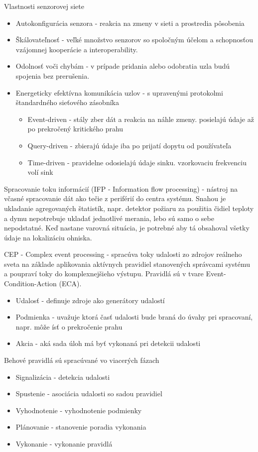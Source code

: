 Vlastnosti senzorovej siete
\begin{itemize}
\itemsep0em
\item Autokonfigurácia senzora - reakcia na zmeny v sieti a prostredia pôsobenia
\item Škálovateľnosť - veľké množstvo senzorov so spoločným účelom a schopnosťou vzájomnej kooperácie a interoperability.
\item Odolnosť voči chybám - v prípade pridania alebo odobratia uzla budú spojenia bez prerušenia.
\item Energeticky efektívna komunikácia uzlov - s upravenými protokolmi štandardného sieťového zásobníka
\begin{itemize}
\itemsep0em
\item Event-driven - stály zber dát a reakcia na náhle zmeny. posielajú údaje až po prekročený kritického prahu
\item Query-driven - zbierajú údaje iba po prijatí dopytu od používateľa
\item Time-driven - pravidelne odosielajú údaje sinku. vzorkovaciu frekvenciu volí sink
\end{itemize}
\end{itemize}
\cite{wsn-overview}

Spracovanie toku informácií (IFP - Information flow processing) - nástroj na včasné spracovanie dát ako tečie z periférií do centra systému. Snahou je ukladanie agregovaných štatistík, napr. detektor požiaru za použitia čidiel teploty a dymu nepotrebuje ukladať jednotlivé merania, lebo sú samo o sebe nepodstatné. Keď nastane varovná situácia, je potrebné aby tá obsahoval všetky údaje na lokalizáciu ohniska.

CEP - Complex event processing - spracúva toky udalosti zo zdrojov reálneho sveta na základe aplikovania aktívnych pravidiel stanovených správcami systému a poupraví toky do komplexnejšieho výstupu. Pravidlá sú v tvare Event-Condition-Action (ECA).
\begin{itemize}
\itemsep0em
\item Udalosť - definuje zdroje ako generátory udalostí
\item Podmienka - uvažuje ktorá časť udalosti bude braná do úvahy pri spracovaní, napr. môže ísť o prekročenie prahu
\item Akcia - aká sada úloh má byť vykonaná pri detekcii udalosti
\end{itemize}

Behové pravidlá sú spracúvané vo viacerých fázach
\begin{itemize}
\item Signalizácia - detekcia udalosti
\item Spustenie - asociácia udalosti so sadou pravidiel
\item Vyhodnotenie - vyhodnotenie podmienky
\item Plánovanie - stanovenie poradia vykonania
\item Vykonanie - vykonanie pravidlá
\end{itemize}
\cite{processing-information-flows}

